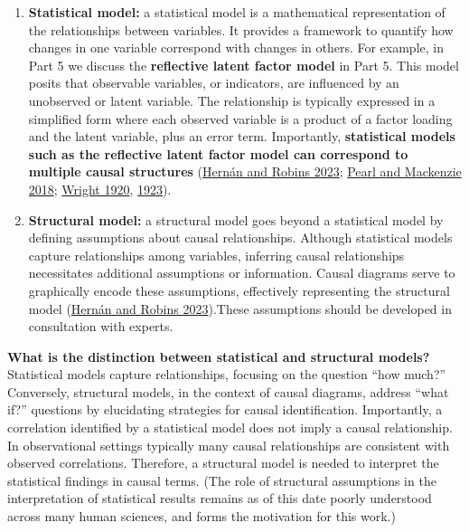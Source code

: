 \documentclass[
  singlecolumn]{article}
\begin{document}
\begin{enumerate}
\def\labelenumi{\arabic{enumi}.}
\setcounter{enumi}{16}
\item
  \textbf{Statistical model:} a statistical model is a mathematical
  representation of the relationships between variables. It provides a
  framework to quantify how changes in one variable correspond with
  changes in others. For example, in Part 5 we discuss the
  \textbf{reflective latent factor model} in Part 5. This model posits
  that observable variables, or indicators, are influenced by an
  unobserved or latent variable. The relationship is typically expressed
  in a simplified form where each observed variable is a product of a
  factor loading and the latent variable, plus an error term.
  Importantly, \textbf{statistical models such as the reflective latent
  factor model can correspond to multiple causal structures}
  (\protect\hyperlink{ref-hernuxe1n2023}{Hernán and Robins 2023};
  \protect\hyperlink{ref-pearl2018}{Pearl and Mackenzie 2018};
  \protect\hyperlink{ref-wright1920}{Wright 1920},
  \protect\hyperlink{ref-wright1923}{1923}).
\item
  \textbf{Structural model:} a structural model goes beyond a
  statistical model by defining assumptions about causal relationships.
  Although statistical models capture relationships among variables,
  inferring causal relationships necessitates additional assumptions or
  information. Causal diagrams serve to graphically encode these
  assumptions, effectively representing the structural model
  (\protect\hyperlink{ref-hernuxe1n2023}{Hernán and Robins 2023}).These
  assumptions should be developed in consultation with experts.
\end{enumerate}

\textbf{What is the distinction between statistical and structural
models?} Statistical models capture relationships, focusing on the
question ``how much?'' Conversely, structural models, in the context of
causal diagrams, address ``what if?'' questions by elucidating
strategies for causal identification. Importantly, a correlation
identified by a statistical model does not imply a causal relationship.
In observational settings typically many causal relationships are
consistent with observed correlations. Therefore, a structural model is
needed to interpret the statistical findings in causal terms. (The role
of structural assumptions in the interpretation of statistical results
remains as of this date poorly understood across many human sciences,
and forms the motivation for this work.)
\end{document}
